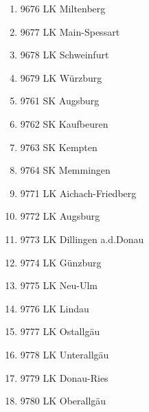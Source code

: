 \begin{enumerate}[itemsep=-6mm]
\item 9676 LK Miltenberg
\item 9677 LK Main-Spessart
\item 9678 LK Schweinfurt
\item 9679 LK Würzburg
\item 9761 SK Augsburg
\item 9762 SK Kaufbeuren
\item 9763 SK Kempten
\item 9764 SK Memmingen
\item 9771 LK Aichach-Friedberg
\item 9772 LK Augsburg
\item 9773 LK Dillingen a.d.Donau
\item 9774 LK Günzburg
\item 9775 LK Neu-Ulm
\item 9776 LK Lindau
\item 9777 LK Ostallgäu
\item 9778 LK Unterallgäu
\item 9779 LK Donau-Ries
\item 9780 LK Oberallgäu
\end{enumerate}
